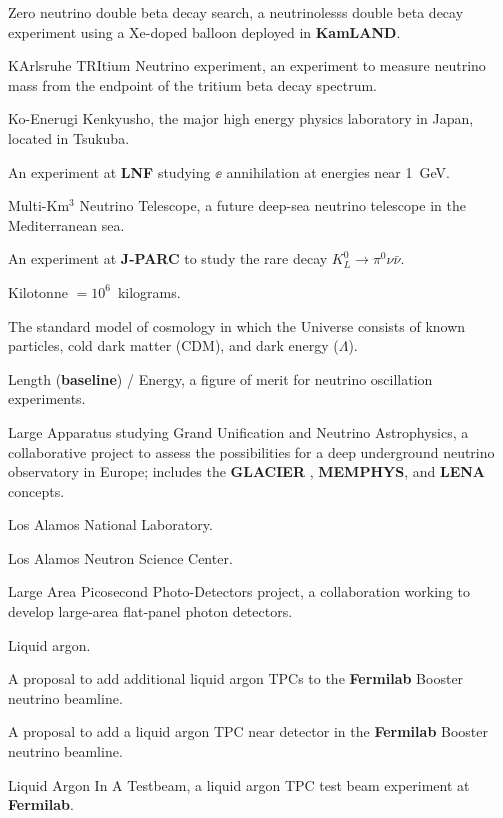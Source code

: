  Zero neutrino double beta decay search, a 
neutrinolesss double beta decay experiment using a Xe-doped balloon 
deployed in {\bf KamLAND}.
  
 KArlsruhe TRItium Neutrino experiment, an experiment to
measure neutrino mass from the endpoint of the tritium beta decay spectrum. 

 Ko-Enerugi Kenkyusho, the major high energy physics laboratory
in Japan, located in Tsukuba.


  An experiment at {\bf LNF} studying
     $\ee$ annihilation at energies near 1~GeV.


 Multi-Km$^3$ Neutrino Telescope, a
future deep-sea neutrino telescope in the Mediterranean sea.

 An experiment at {\bf J-PARC} to study the rare 
decay $K^0_L\to \pi^0 \nu\bar \nu$. 


 Kilotonne $= 10^6$~kilograms.

  The standard model of cosmology in which the Universe
consists of known particles, cold dark matter (CDM), and dark energy
($\Lambda$).

   Length ({\bf baseline}) / Energy, a figure of
merit for  neutrino oscillation experiments.

 Large Apparatus studying Grand Unification and Neutrino
Astrophysics, a collaborative project to assess the possibilities for a deep
underground neutrino observatory in Europe; includes the {\bf GLACIER },
{\bf MEMPHYS}, and {\bf LENA} concepts.

 Los Alamos National Laboratory.

 Los Alamos Neutron Science Center.

 Large Area Picosecond Photo-Detectors project, a
collaboration working to develop large-area flat-panel photon detectors.

 Liquid argon.

 A proposal to add additional liquid argon TPCs to
the {\bf Fermilab} Booster neutrino beamline.

 A proposal to add a liquid argon TPC near
detector in the {\bf Fermilab} Booster neutrino beamline.

 Liquid Argon In A Testbeam,  
a liquid argon TPC test beam experiment at {\bf Fermilab}.


